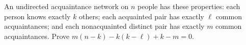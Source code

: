 An undirected acquaintance network on $n$ people has these properties: each person knows exactly $k$ others; each acquainted pair has exactly $\ell$ common acquaintances; and each nonacquainted distinct pair has exactly $m$ common acquaintances. Prove $m(n-k)-k(k-\ell)+k-m=0$.
